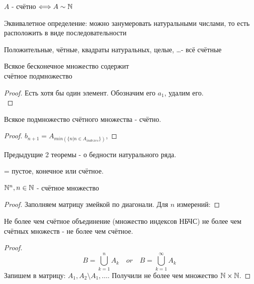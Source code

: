 \documentclass[12pt, a4paper]{article}
\begin{document}
    \begin{definition}
      $A$ - счётно $\Longleftrightarrow A \sim  {\mathbb{N}}$
      
      Эквивалетное определение: можно занумеровать 
      натуральными числами, то есть расположить
       в виде последовательности
    \end{definition}

    \begin{example}
      Положительные, чётные, квадраты натуральных, целые, \dots - всё счётные
    \end{example}

    \begin{theorem}
      Всякое бесконечное множество содержит\\
       счётное подмножество  
    \end{theorem}
    \begin{proof}
      Есть хотя бы один элемент. Обозначим его $a_1$, удалим его. \\
      \inductdots 
    \end{proof}


    \begin{theorem}
      Всякое подмножество счётного множества - счётно.  
    \end{theorem}
    \begin{proof}
      $b_{n + 1} = A_{min(\{n | n \in A_{indexes}\})}$, \inductdots
    \end{proof}
    
    Предыдущие 2 теоремы - о бедности натурального ряда.

    \begin{definition}
       = пустое, конечное или счётное.
    \end{definition}

    \begin{lemma}
      ${\mathbb{N}}^n, n \in {\mathbb{N}}$ - счётное множество
    \end{lemma}
    \begin{proof}
      Заполняем матрицу змейкой по диагонали.
      Для $n$ измерений: \inductdots
    \end{proof}
    
    \begin{theorem}
      Не более чем счётное объединение (множество индексов НБЧС) 
      не более чем счётных множеств - не более чем счётное.
    \end{theorem}
    \begin{proof}
      \begin{equation}
        B = \bigcup_{k = 1}^{n} A_k \quad or \quad B = \bigcup_{k = 1}^{\infty} A_k
      \end{equation}
      Запишем в матрицу: $A_1, A_2 \setminus A_1, \ldots$. Получили не более чем множество ${\mathbb{N}} \times {\mathbb{N}}$.
    \end{proof}
\end{document}
